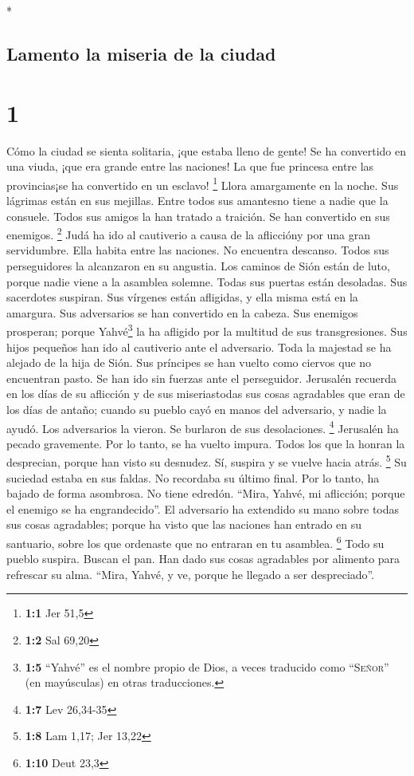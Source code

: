 \begin{paracol}{2} \switchcolumn[0]*

\hypertarget{lamento-la-miseria-de-la-ciudad}{%
\subsection{Lamento la miseria de la
ciudad}\label{lamento-la-miseria-de-la-ciudad}}

\hypertarget{section}{%
\section{1}\label{section}}

 Cómo la ciudad se sienta solitaria, ¡que estaba lleno de
gente! Se ha convertido en una viuda, ¡que era grande entre las
naciones! La que fue princesa entre las provincias¡se ha convertido en
un esclavo! \footnote{\textbf{1:1} Jer 51,5}  Llora
amargamente en la noche. Sus lágrimas están en sus mejillas. Entre todos
sus amantesno tiene a nadie que la consuele. Todos sus amigos la han
tratado a traición. Se han convertido en sus enemigos. \footnote{\textbf{1:2}
  Sal 69,20}  Judá ha ido al cautiverio a causa de la
afliccióny por una gran servidumbre. Ella habita entre las naciones. No
encuentra descanso. Todos sus perseguidores la alcanzaron en su
angustia.  Los caminos de Sión están de luto, porque nadie
viene a la asamblea solemne. Todas sus puertas están desoladas. Sus
sacerdotes suspiran. Sus vírgenes están afligidas, y ella misma está en
la amargura.  Sus adversarios se han convertido en la
cabeza. Sus enemigos prosperan; porque Yahvé\footnote{\textbf{1:5}
  ``Yahvé'' es el nombre propio de Dios, a veces traducido como
  ``\textsc{Señor}'' (en mayúsculas) en otras traducciones.} la ha
afligido por la multitud de sus transgresiones. Sus hijos pequeños han
ido al cautiverio ante el adversario.  Toda la majestad se
ha alejado de la hija de Sión. Sus príncipes se han vuelto como ciervos
que no encuentran pasto. Se han ido sin fuerzas ante el perseguidor.
 Jerusalén recuerda en los días de su aflicción y de sus
miseriastodas sus cosas agradables que eran de los días de antaño;
cuando su pueblo cayó en manos del adversario, y nadie la ayudó. Los
adversarios la vieron. Se burlaron de sus desolaciones. \footnote{\textbf{1:7}
  Lev 26,34-35}  Jerusalén ha pecado gravemente. Por lo
tanto, se ha vuelto impura. Todos los que la honran la desprecian,
porque han visto su desnudez. Sí, suspira y se vuelve hacia atrás.
\footnote{\textbf{1:8} Lam 1,17; Jer 13,22}  Su suciedad
estaba en sus faldas. No recordaba su último final. Por lo tanto, ha
bajado de forma asombrosa. No tiene edredón. ``Mira, Yahvé, mi
aflicción; porque el enemigo se ha engrandecido''.  El
adversario ha extendido su mano sobre todas sus cosas agradables; porque
ha visto que las naciones han entrado en su santuario, sobre los que
ordenaste que no entraran en tu asamblea. \footnote{\textbf{1:10} Deut
  23,3}  Todo su pueblo suspira. Buscan el pan. Han dado
sus cosas agradables por alimento para refrescar su alma. ``Mira, Yahvé,
y ve, porque he llegado a ser despreciado''.


\end{paracol}
